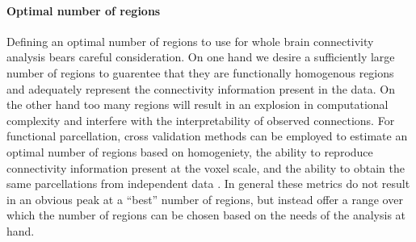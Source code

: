 \documentclass[5p]{elsarticle}
\begin{document}
\paragraph{Optimal number of regions}
%
Defining an optimal number of regions to use for whole brain connectivity analysis bears
careful consideration. On one hand we desire a sufficiently large number of
regions to guarentee that they are functionally homogenous regions and adequately 
represent the connectivity information present in the data. On the other hand
too many regions will result in an explosion in computational complexity 
and interfere with the interpretability of observed connections. For functional
parcellation, cross validation methods can be employed to estimate an optimal 
number of regions based on homogeniety, the ability to reproduce 
connectivity information present at the voxel scale, and the ability to
obtain the same parcellations from independent data 
\cite{craddock2011, blumensath2012}. In general these metrics do not result in an
obvious peak at a ``best'' number of regions, but instead offer a range over
which the number of regions can be chosen based on the needs of the analysis at
hand.
\end{document}
